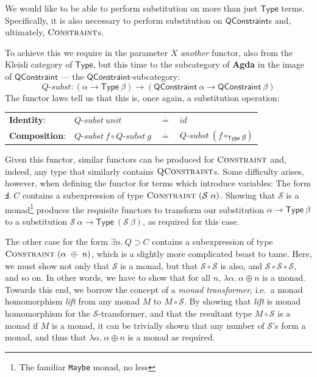 \documentclass[a4paper]{jfp}
\begin{document}
We would like to be able to perform substitution on more than just $\mathsf{Type}$ terms. Specifically, it is also necessary to perform 
substitution on $\mathsf{QConstraint}$s and, ultimately, $\textsc{Constraint}$s.

To achieve this we require in the parameter $X$ \emph{another} functor, also from the Kleisli category of $\textsf{Type}$, but this time to the 
subcategory of \textbf{Agda} in the image of $\textsf{QConstraint}$ --- the $\textsf{QConstraint}$-subcategory: 
\begin{displaymath}
   \textit{Q-subst} : (\alpha \rightarrow \textsf{Type}\ \beta) \rightarrow (\textsf{QConstraint}\ \alpha \rightarrow \textsf{QConstraint}\ \beta)
\end{displaymath}
The functor laws tell us that this is, once again, a substitution operation:

\begin{tabular}{llll}
      \textbf{Identity}: & $\textit{Q-subst}\ \mathit{unit} $&$\stackrel{\cdot}{=}$&$ \mathit{id}$\\
      \textbf{Composition}:& $\textit{Q-subst}\ f \circ \textit{Q-subst}\ g $&$\stackrel{\cdot}{=}$&$ \textit{Q-subst}\ (f \circ_\textsf{Type} g)$\\
\end{tabular}

Given this functor, similar functors can be produced for $\textsc{Constraint}$ and, indeed, any type that similarly contains $\textsc{QConstraint}$s.
Some difficulty arises, however, when defining the functor for terms which introduce variables: The form $\Finv.\ C$ contains a subexpression of type
$\textsc{Constraint}\ (\mathcal{S}\ \alpha)$. Showing that $\mathcal{S}$ is a monad\footnote{The familiar \texttt{Maybe} monad, no less} produces the
requisite functors to transform our substitution $\alpha \rightarrow \textsf{Type}\ \beta$ to a substitution $\mathcal{S}\ \alpha \rightarrow
\textsf{Type}\ (\mathcal{S}\ \beta)$, as required for this case. 

The other case for the form $\exists n.\ Q \supset C$ contains a subexpression of type
$\textsc{Constraint}\ (\alpha\ \oplus\ n)$, which is a slightly more complicated beast to tame. Here, we must show not only that $\mathcal{S}$ is a monad, but that
$\mathcal{S} \circ \mathcal{S}$ is also, and $\mathcal{S} \circ \mathcal{S} \circ \mathcal{S}$, and so on. In other words, we have to show that for all
$n$, $\lambda \alpha.\ \alpha \oplus n$ is a monad.  Towards this end, we borrow the concept of a \emph{monad transformer}, i.e.\ a monad homomorphism \emph{lift} from
any monad $M$ to $M \circ \mathcal{S}$. By showing that \emph{lift} is monad homomorphism for the $\mathcal{S}$-transformer, and that the resultant type
$M \circ \mathcal{S}$ is a monad if $M$ is a monad, it can be trivially shown that any number of $\mathcal{S}$'s form a monad, and
thus that $\lambda \alpha.\ \alpha \oplus n$ is a monad as required.                                                                
\end{document}
